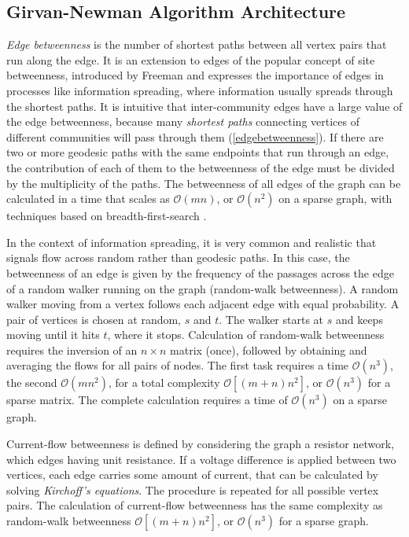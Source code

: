 {\subsection{Girvan-Newman Algorithm Architecture}
\textit{Edge betweenness} is the number of shortest paths between all vertex pairs that run along the edge. It is an extension to edges of the popular concept of site betweenness, introduced by Freeman \cite{ref-11} and expresses the importance of edges in processes like information spreading, where information usually spreads through the shortest paths. It is intuitive that inter-community edges have a large value of the edge betweenness, because many \textit{shortest paths} connecting vertices of different communities will pass through them (\ref{edgebetweenness}). If there are two or more geodesic paths with the same endpoints that run through an edge, the contribution of each of them to the betweenness of the edge must be divided by the multiplicity of the paths. The betweenness of all edges of the graph can be calculated in a time that scales as $\mathcal{O}(mn)$, or $\mathcal{O}(n^2)$ on a sparse graph, with techniques based on breadth-first-search \cite{ref-12}.

In the context of information spreading, it is very common and realistic that signals flow across random rather than geodesic paths. In this case, the betweenness of an edge is given by the frequency of the passages across the edge of a random walker running on the graph (random-walk betweenness). A random walker moving from a vertex follows each adjacent edge with equal probability. A pair of vertices is chosen at random, $s$ and $t$. The walker starts at $s$ and keeps moving until it hits $t$, where it stops. Calculation of random-walk betweenness requires the inversion of an $n \times n$ matrix (once), followed by obtaining and averaging the flows for all pairs of nodes. The first task requires a time $\mathcal{O}(n^3)$, the second $\mathcal{O}(mn^2)$, for a total complexity $\mathcal{O}[(m + n)n^2]$, or $\mathcal{O}(n^3)$ for a sparse matrix. The complete calculation requires a time of $\mathcal{O}(n^3)$ on a sparse graph.

Current-flow betweenness is defined by considering the graph a resistor network, which edges having unit resistance. If a voltage difference is applied between two vertices, each edge carries some amount of current, that can be calculated by solving \textit{Kirchoff's equations}. The procedure is repeated for all possible vertex pairs. The calculation of current-flow betweenness has the same complexity as random-walk betweenness $\mathcal{O}[(m + n)n^2]$, or $\mathcal{O}(n^3)$ for a sparse graph.

}
